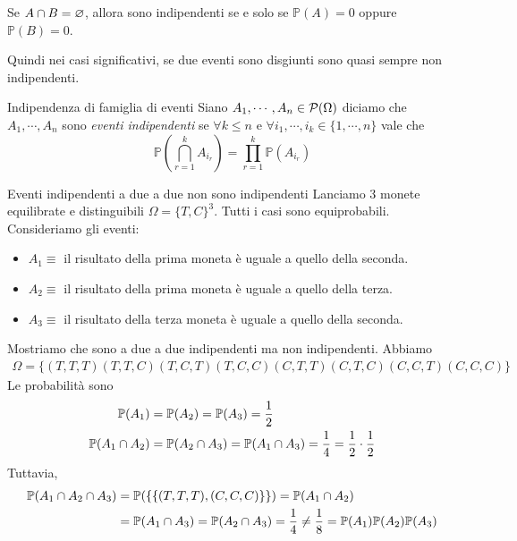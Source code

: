 \documentclass[a4paper]{article}
\begin{document}
\begin{snippetproposition}{}
    Se \(A \cap B = \varnothing\), allora
    sono indipendenti se e solo se \(\mathbb P(A) = 0\)
    oppure \(\mathbb P(B) = 0\).
\end{snippetproposition}

Quindi nei casi significativi, se due eventi sono disgiunti sono quasi sempre non indipendenti.

\begin{snippetdefinition}{Indipendenza di famiglia di eventi}
    Siano \(A_1, \cdots, A_n \in \mathcal P(\Omega)\)
    diciamo che \(A_1, \cdots, A_n\) sono \emph{eventi indipendenti} se
    \(\forall k \leq n\) e \(\forall i_1, \cdots, i_k \in \{1, \cdots, n\}\)
    vale che
    \[
        \mathbb P\left(
            \bigcap_{r=1}^k A_{i_r}
        \right) = \prod_{r=1}^k \mathbb P\left(
            A_{i_r}
        \right)
    \]
\end{snippetdefinition}

\begin{snippetexample}{Eventi indipendenti a due a due non sono indipendenti}
    Lanciamo 3 monete equilibrate e distinguibili \(\Omega = \{T, C\}^3\).
    Tutti i casi sono equiprobabili.
    Consideriamo gli eventi:
    \begin{itemize}
        \item \(A_1 \equiv\) il risultato della prima moneta è uguale
            a quello della seconda.
        \item \(A_2 \equiv\) il risultato della prima moneta è uguale
            a quello della terza.
        \item \(A_3 \equiv\) il risultato della terza moneta è uguale
            a quello della seconda.
    \end{itemize}
    Mostriamo che sono a due a due indipendenti ma non indipendenti.
    Abbiamo
    \begin{align*}
        \Omega = \{
            (T,T,T)
            (T,T,C)
            (T,C,T)
            (T,C,C)
            (C,T,T)
            (C,T,C)
            (C,C,T)
            (C,C,C)
        \}
    \end{align*}
    Le probabilità sono
    \begin{align*}
        \mathbb P(A_1) &= \mathbb P(A_2) = \mathbb P(A_3) = \frac12 \\
        \mathbb P(A_1 \cap A_2)
        &= \mathbb P(A_2 \cap A_3)
        = \mathbb P(A_1 \cap A_3) = \frac14 = \frac12 \cdot \frac12
    \end{align*}
    Tuttavia,
    \begin{align*}
        \mathbb P(A_1 \cap A_2 \cap A_3) &= \mathbb P(\{
                \{(T, T, T), (C, C, C)\}
        \}) = \mathbb P(A_1 \cap A_2) \\
        &= \mathbb P(A_1 \cap A_3) = \mathbb P(A_2 \cap A_3) = \frac{1}{4} \neq \frac18
        = \mathbb P(A_1)\mathbb P(A_2)\mathbb P(A_3)
    \end{align*}
\end{snippetexample}
\end{document}
